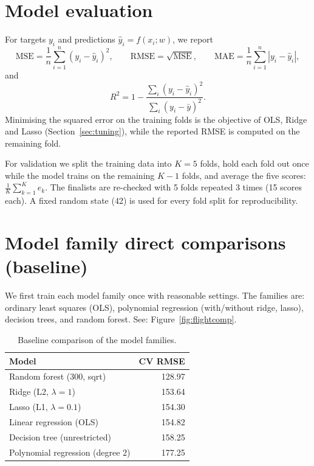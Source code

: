 \documentclass[11pt]{article}
\begin{document}
\section{Model evaluation}

For targets $y_i$ and predictions $\hat{y}_i = f(x_i;w)$, we report
\[
  \mathrm{MSE} = \frac{1}{n}\sum_{i=1}^{n}(y_i-\hat{y}_i)^2, \qquad
  \mathrm{RMSE} = \sqrt{\mathrm{MSE}}, \qquad
  \mathrm{MAE} = \frac{1}{n}\sum_{i=1}^{n}|y_i-\hat{y}_i|,
\]
and
\[
  R^2 = 1 - \frac{\sum_i (y_i-\hat{y}_i)^2}{\sum_i (y_i-\bar{y})^2}.
\]
Minimising the squared error on the training folds is the objective of OLS, Ridge and Lasso (Section~\ref{sec:tuning}), while the reported RMSE is computed on the remaining fold.

For validation we split the training data into $K=5$ folds, hold each fold out once while the model trains on the remaining $K-1$ folds, and average the five scores: $\frac{1}{K}\sum_{k=1}^{K} e_k$. The finalists are re-checked with 5 folds repeated 3 times (15 scores each). A fixed random state (42) is used for every fold split for reproducibility.

\section{Model family direct comparisons (baseline)}\label{sec:families}

We first train each model family once with reasonable settings. The families are: ordinary least squares (OLS), polynomial regression (with/without ridge, lasso), decision trees, and random forest. See: Figure~\ref{fig:flightcomp}.

\begin{table}[H]
\centering
\small
\begin{tabular}{@{}>{\raggedright\arraybackslash}p{6.0cm}r@{}}
\toprule
Model & CV RMSE \\
\midrule
Random forest (300, sqrt) & 128.97 \\
Ridge (L2, $\lambda=1$) & 153.64 \\
Lasso (L1, $\lambda=0.1$) & 154.30 \\
Linear regression (OLS) & 154.82 \\
Decision tree (unrestricted) & 158.25 \\
Polynomial regression (degree 2) & 177.25 \\
\bottomrule
\end{tabular}
\caption{Baseline comparison of the model families.}
\label{tab:flightbaseline}
\end{table}
\end{document}
